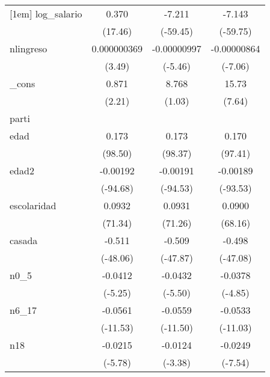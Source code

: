 {\begin{tabular}{l*{3}{c}}
[1em]
log\_salario &       0.370\sym{***}&      -7.211\sym{***}&      -7.143\sym{***}\\
            &     (17.46)         &    (-59.45)         &    (-59.75)         \\
[1em]
nlingreso   & 0.000000369\sym{***}& -0.00000997\sym{***}& -0.00000864\sym{***}\\
            &      (3.49)         &     (-5.46)         &     (-7.06)         \\
[1em]
\_cons      &       0.871\sym{*}  &       8.768         &       15.73\sym{***}\\
            &      (2.21)         &      (1.03)         &      (7.64)         \\
\hline
parti       &                     &                     &                     \\
edad        &       0.173\sym{***}&       0.173\sym{***}&       0.170\sym{***}\\
            &     (98.50)         &     (98.37)         &     (97.41)         \\
[1em]
edad2       &    -0.00192\sym{***}&    -0.00191\sym{***}&    -0.00189\sym{***}\\
            &    (-94.68)         &    (-94.53)         &    (-93.53)         \\
[1em]
escolaridad &      0.0932\sym{***}&      0.0931\sym{***}&      0.0900\sym{***}\\
            &     (71.34)         &     (71.26)         &     (68.16)         \\
[1em]
casada      &      -0.511\sym{***}&      -0.509\sym{***}&      -0.498\sym{***}\\
            &    (-48.06)         &    (-47.87)         &    (-47.08)         \\
[1em]
n0\_5        &     -0.0412\sym{***}&     -0.0432\sym{***}&     -0.0378\sym{***}\\
            &     (-5.25)         &     (-5.50)         &     (-4.85)         \\
[1em]
n6\_17       &     -0.0561\sym{***}&     -0.0559\sym{***}&     -0.0533\sym{***}\\
            &    (-11.53)         &    (-11.50)         &    (-11.03)         \\
[1em]
n18         &     -0.0215\sym{***}&     -0.0124\sym{***}&     -0.0249\sym{***}\\
            &     (-5.78)         &     (-3.38)         &     (-7.54)         \\

\end{tabular}}
